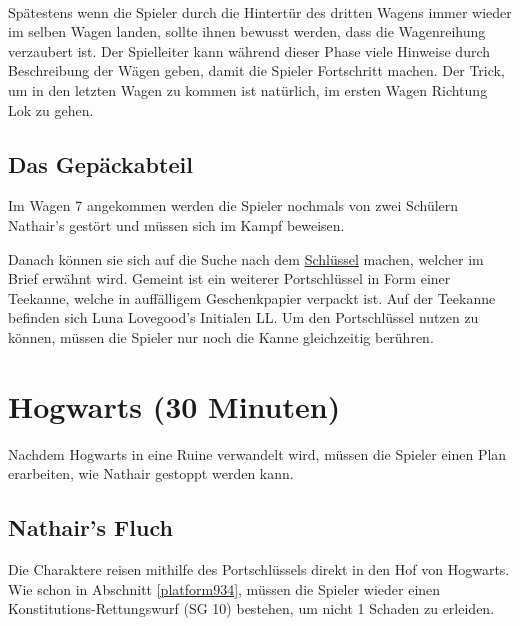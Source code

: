 \documentclass[]{scrartcl}
\begin{document}
~\\

Spätestens wenn die Spieler durch die Hintertür des dritten Wagens immer wieder im selben Wagen landen, sollte ihnen bewusst werden, dass die Wagenreihung verzaubert ist. Der Spielleiter kann während dieser Phase viele Hinweise durch Beschreibung der Wägen geben, damit die Spieler Fortschritt machen. Der Trick, um in den letzten Wagen zu kommen ist natürlich, im ersten Wagen Richtung Lok zu gehen.

\subsection{Das Gepäckabteil}

Im Wagen 7 angekommen werden die Spieler nochmals von zwei Schülern Nathair's gestört und müssen sich im Kampf beweisen.


Danach können sie sich auf die Suche nach dem \underline{Schlüssel} machen, welcher im Brief erwähnt wird. Gemeint ist ein weiterer Portschlüssel in Form einer Teekanne, welche in auffälligem Geschenkpapier verpackt ist. Auf der Teekanne befinden sich Luna Lovegood's Initialen {\calligra LL}. Um den Portschlüssel nutzen zu können, müssen die Spieler nur noch die Kanne gleichzeitig berühren.

\section{Hogwarts (30 Minuten)}

Nachdem Hogwarts in eine Ruine verwandelt wird, müssen die Spieler einen Plan erarbeiten, wie Nathair gestoppt werden kann.

\subsection{Nathair's Fluch}

Die Charaktere reisen mithilfe des Portschlüssels direkt in den Hof von Hogwarts. Wie schon in Abschnitt \ref{platform934}, müssen die Spieler wieder einen Konstitutions-Rettungswurf (SG 10) bestehen, um nicht 1 Schaden zu erleiden.

\end{document}

